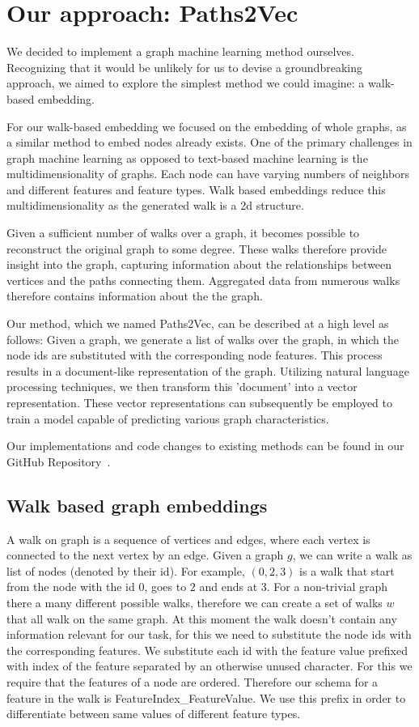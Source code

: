 \section{Our approach: Paths2Vec}

We decided to implement a graph machine learning method ourselves. Recognizing that it would be unlikely for us to devise a groundbreaking approach, we aimed to explore the simplest method we could imagine: a walk-based embedding.

For our walk-based embedding we focused on the embedding of whole graphs, as a similar method to embed nodes already exists\cite{2016node2vec}. One of the primary challenges in graph machine learning as opposed to text-based machine learning is the multidimensionality of graphs. Each node can have varying numbers of neighbors and different features and feature types. Walk based embeddings reduce this multidimensionality as the generated walk is a 2d structure.

Given a sufficient number of walks over a graph, it becomes possible to reconstruct the original graph to some degree\cite{Wittmann2009reconstruction}. These walks therefore provide insight into the graph, capturing information about the relationships between vertices and the paths connecting them. Aggregated data from numerous walks therefore contains information about the the graph.

Our method, which we named Paths2Vec, can be described at a high level as follows: Given a graph, we generate a list of walks over the graph, in which the node ids are substituted with the corresponding node features. This process results in a document-like representation of the graph. Utilizing natural language processing techniques, we then transform this 'document' into a vector representation. These vector representations can subsequently be employed to train a model capable of predicting various graph characteristics.

Our implementations and code changes to existing methods can be found in our GitHub Repository~\cite{our_repo}.

\subsection{Walk based graph embeddings}
A walk on graph is a sequence of vertices and edges, where each vertex is connected to the next vertex by an edge. Given a graph $g$, we can write a walk as list of nodes (denoted by their id). For example, $(0, 2, 3)$ is a walk that start from the node with the id $0$, goes to $2$ and ends at $3$. For a non-trivial graph there a many different possible walks, therefore we can create a set of walks $w$ that all walk on the same graph. At this moment the walk doesn't contain any information relevant for our task, for this we need to substitute the node ids with the corresponding features. We substitute each id with the feature value prefixed with index of the feature separated by an otherwise unused character. For this we require that the features of a node are ordered. Therefore our schema for a feature in the walk is FeatureIndex\_FeatureValue. We use this prefix in order to differentiate between same values of different feature types.


